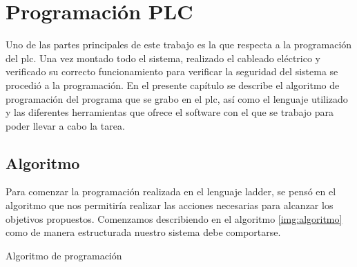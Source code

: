\chapter{Programación PLC}
\label{ch:progPLC}

Uno de las partes principales de este trabajo es la que respecta a
la programación del \gls{plc}. Una vez montado todo el sistema, 
realizado el cableado eléctrico y verificado su correcto funcionamiento
para verificar la seguridad del sistema se procedió a la programación.
En el presente capítulo se describe el algoritmo 
de programación del programa que se grabo en el \gls{plc}, así como el 
lenguaje utilizado y las diferentes herramientas que ofrece el software 
con el que se trabajo para poder llevar a cabo la tarea.

\section{Algoritmo}
\label{sec:Algoritmo}
Para comenzar la programación realizada en el lenguaje ladder,
se pensó en el algoritmo que nos permitiría realizar las acciones
necesarias para alcanzar los objetivos propuestos. Comenzamos describiendo
en el algoritmo \ref{img:algoritmo} como de manera estructurada nuestro
sistema debe comportarse.

\begin{algorithm}[H]

  
 \caption{Algoritmo de programación}
 \label{img:algoritmo}
\end{algorithm}

